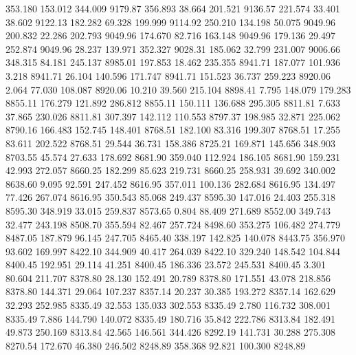  353.180  153.012  344.009      9179.87
 356.893   38.664  201.521      9136.57
 221.574   33.401   38.602      9122.13
 182.282   69.328  199.999      9114.92
 250.210  134.198   50.075      9049.96
 200.832   22.286  202.793      9049.96
 174.670   82.716  163.148      9049.96
 179.136   29.497  252.874      9049.96
  28.237  139.971  352.327      9028.31
 185.062   32.799  231.007      9006.66
 348.315   84.181  245.137      8985.01
 197.853   18.462  235.355      8941.71
 187.077  101.936    3.218      8941.71
  26.104  140.596  171.747      8941.71
 151.523   36.737  259.223      8920.06
   2.064   77.030  108.087      8920.06
  10.210   39.560  215.104      8898.41
   7.795  148.079  179.283      8855.11
 176.279  121.892  286.812      8855.11
 150.111  136.688  295.305      8811.81
   7.633   37.865  230.026      8811.81
 307.397  142.112  110.553      8797.37
 198.985   32.871  225.062      8790.16
 166.483  152.745  148.401      8768.51
 182.100   83.316  199.307      8768.51
  17.255   83.611  202.522      8768.51
  29.544   36.731  158.386      8725.21
 169.871  145.656  348.903      8703.55
  45.574   27.633  178.692      8681.90
 359.040  112.924  186.105      8681.90
 159.231   42.993  272.057      8660.25
 182.299   85.623  219.731      8660.25
 258.931   39.692  340.002      8638.60
   9.095   92.591  247.452      8616.95
 357.011  100.136  282.684      8616.95
 134.497   77.426  267.074      8616.95
 350.543   85.068  249.437      8595.30
 147.016   24.403  255.318      8595.30
 348.919   33.015  259.837      8573.65
   0.804   88.409  271.689      8552.00
 349.743   32.477  243.198      8508.70
 355.594   82.467  257.724      8498.60
 353.275  106.482  274.779      8487.05
 187.879   96.145  247.705      8465.40
 338.197  142.825  140.078      8443.75
 356.970   93.602  169.997      8422.10
 344.909   40.417  264.039      8422.10
 329.240  148.542  104.844      8400.45
 192.951   29.114   41.251      8400.45
 186.336   23.572  245.531      8400.45
   3.301   80.604  211.707      8378.80
  28.130  152.491   20.789      8378.80
 171.551   43.078  218.856      8378.80
 144.371   29.064  107.237      8357.14
  20.237   30.385  193.272      8357.14
 162.629   32.293  252.985      8335.49
  32.553  135.033  302.553      8335.49
   2.780  116.732  308.001      8335.49
   7.886  144.790  140.072      8335.49
 180.716   35.842  222.786      8313.84
 182.491   49.873  250.169      8313.84
  42.565  146.561  344.426      8292.19
 141.731   30.288  275.308      8270.54
 172.670   46.380  246.502      8248.89
 358.368   92.821  100.300      8248.89
